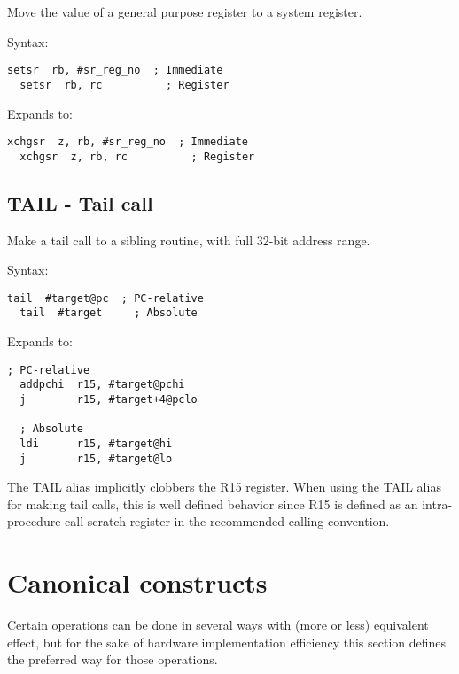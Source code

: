 Move the value of a general purpose register to a system register.

Syntax:
\begin{lstlisting}[style=assembler]
  setsr  rb, #sr_reg_no  ; Immediate
  setsr  rb, rc          ; Register
\end{lstlisting}

Expands to:
\begin{lstlisting}[style=assembler]
  xchgsr  z, rb, #sr_reg_no  ; Immediate
  xchgsr  z, rb, rc          ; Register
\end{lstlisting}

\subsection{TAIL - Tail call}
\label{insn:TAIL}

Make a tail call to a sibling routine, with full 32-bit address range.

Syntax:
\begin{lstlisting}[style=assembler]
  tail  #target@pc  ; PC-relative
  tail  #target     ; Absolute
\end{lstlisting}

Expands to:
\begin{lstlisting}[style=assembler]
  ; PC-relative
  addpchi  r15, #target@pchi
  j        r15, #target+4@pclo

  ; Absolute
  ldi      r15, #target@hi
  j        r15, #target@lo
\end{lstlisting}

\begin{notebox}
The TAIL alias implicitly clobbers the R15 register. When using the TAIL alias
for making tail calls, this is well defined behavior since R15 is defined as an
intra-procedure call scratch register in the recommended calling convention.
\end{notebox}

\section{Canonical constructs}

Certain operations can be done in several ways with (more or less) equivalent
effect, but for the sake of hardware implementation efficiency this section
defines the preferred way for those operations.

\tbd
